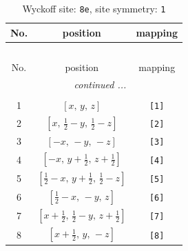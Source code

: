 \documentclass[fleqn,8pt]{jsarticle}
\begin{document}
\renewcommand{\arraystretch}{1.2}
\begin{longtable}{ccc}
\caption{Wyckoff site: {\tt 8e}, site symmetry: {\tt 1}}
 \\
 \hline \hline
No. & position & mapping \\ \hline \endfirsthead

\multicolumn{2}{l}{\tablename\ \thetable{}} \\
 \hline \hline
No. & position & mapping \\ \hline \endhead

 \hline \hline
\multicolumn{2}{r}{\footnotesize\it continued ...} \\ \endfoot

 \hline \hline
\multicolumn{2}{r}{} \\ \endlastfoot

1 & $\left[ x,\, y,\, z \right]$ & {\tt [1]} \\ \hline
2 & $\left[ x,\, \frac{1}{2} - y,\, \frac{1}{2} - z \right]$ & {\tt [2]} \\ \hline
3 & $\left[ - x,\, - y,\, - z \right]$ & {\tt [3]} \\ \hline
4 & $\left[ - x,\, y + \frac{1}{2},\, z + \frac{1}{2} \right]$ & {\tt [4]} \\ \hline
5 & $\left[ \frac{1}{2} - x,\, y + \frac{1}{2},\, \frac{1}{2} - z \right]$ & {\tt [5]} \\ \hline
6 & $\left[ \frac{1}{2} - x,\, - y,\, z \right]$ & {\tt [6]} \\ \hline
7 & $\left[ x + \frac{1}{2},\, \frac{1}{2} - y,\, z + \frac{1}{2} \right]$ & {\tt [7]} \\ \hline
8 & $\left[ x + \frac{1}{2},\, y,\, - z \right]$ & {\tt [8]} \\
\end{longtable}
\end{document}
